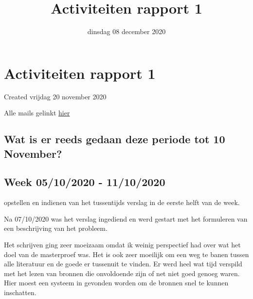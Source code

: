 \documentclass{scrartcl}
\title{Activiteiten rapport 1}
\date{dinsdag 08 december 2020}
\author{}
\begin{document}
\maketitle

		\section{Activiteiten rapport 1}

Created vrijdag 20 november 2020



Alle mails gelinkt \href{./Activities.tex}{hier}



\subsection{Wat is er reeds gedaan deze periode tot 10 November?}



\subsection{Week 05/10/2020 - 11/10/2020}

opstellen en indienen van het tussentijds verslag in de eerste helft van de week.

Na 07/10/2020 was het verslag ingediend en werd gestart met het formuleren van een beschrijving van het probleem.

Het schrijven ging zeer moeizaam omdat ik weinig perspectief had over wat het doel van de masterproef was. Het is ook zeer moeilijk om een weg te banen tussen alle literatuur en de goede er tussenuit te vinden. Er werd heel wat tijd verspild met het lezen van bronnen die onvoldoende zijn of net niet goed genoeg waren. Hier moest een systeem in gevonden worden om de bronnen snel te kunnen inschatten. 
\end{document}
